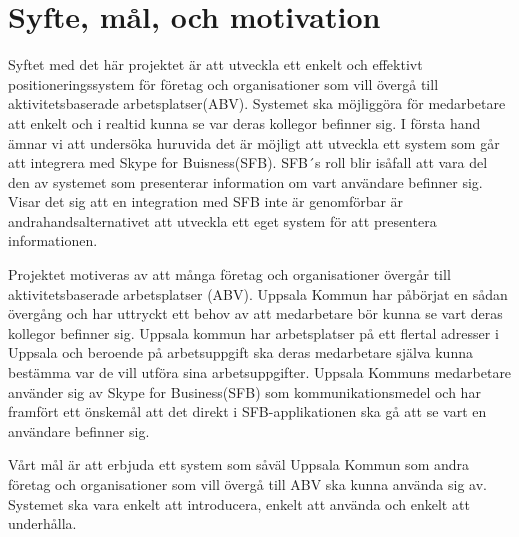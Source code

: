 \documentclass[swedish, a4paper,12pt]{article}
\begin{document}


\newpage
\section{Syfte, mål, och motivation}
Syftet med det här projektet är att utveckla ett enkelt och effektivt positioneringssystem för företag och organisationer som vill övergå till aktivitetsbaserade arbetsplatser(ABV). Systemet ska möjliggöra för medarbetare att enkelt och i realtid kunna se var deras kollegor befinner sig. I första hand ämnar vi att undersöka huruvida det är möjligt att utveckla ett system som går att integrera med Skype for Buisness(SFB). SFB´s roll blir isåfall att vara del den av systemet som presenterar information om vart användare befinner sig. Visar det sig att en integration med SFB inte är genomförbar är andrahandsalternativet att utveckla ett eget system för att presentera informationen.

Projektet motiveras av att många företag och organisationer övergår till aktivitetsbaserade arbetsplatser (ABV). Uppsala Kommun har påbörjat en sådan övergång och har uttryckt ett behov av att medarbetare bör kunna se vart deras kollegor befinner sig. Uppsala kommun har arbetsplatser på ett flertal adresser i Uppsala och beroende på arbetsuppgift ska deras medarbetare själva kunna bestämma var de vill utföra sina arbetsuppgifter. Uppsala Kommuns medarbetare använder sig av Skype for Business(SFB) som kommunikationsmedel och har framfört ett önskemål att det direkt i SFB-applikationen ska gå att se vart en användare befinner sig.

Vårt mål är att erbjuda ett system som såväl Uppsala Kommun som andra företag och organisationer som vill övergå till ABV ska kunna använda sig av. Systemet ska vara enkelt att introducera, enkelt att använda och enkelt att underhålla.
\end{document}
